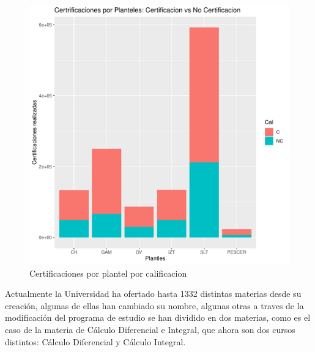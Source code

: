 \documentclass[12pt]{article}
\begin{document}
\begin{figure}
\centering
\includegraphics[scale=0.45]{Graficas/ggplotBarplotPlantelCal3.pdf}
\caption{Certificaciones por plantel por calificacion}
\label{Fig.Cert.Plantel-Cal3}
\end{figure}


Actualmente la Universidad ha ofertado hasta 1332 distintas materias desde su creaci\'on, algunas de ellas han cambiado su nombre, algunas otras a traves de la modificaci\'on del programa de estudio se han dividido en dos materias, como es el caso de la materia de C\'alculo Diferencial e Integral, que ahora son dos cursos distintos: C\'alculo Diferencial y C\'alculo Integral.
\end{document}
